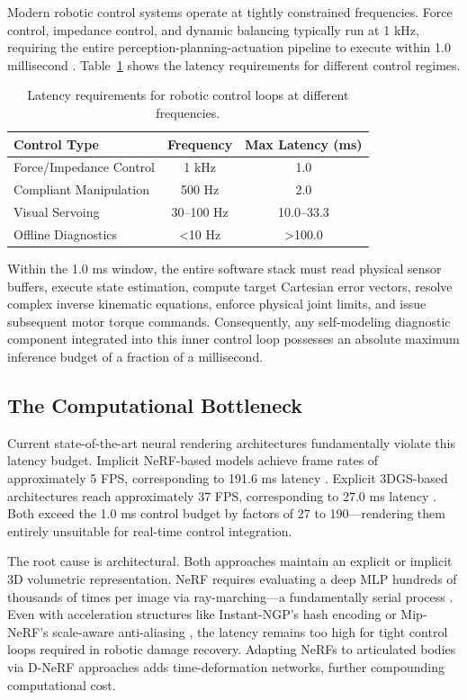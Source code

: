\documentclass[12pt,a4paper,oneside]{report}
\begin{document}
Modern robotic control systems operate at tightly constrained frequencies. Force control, impedance control, and dynamic balancing typically run at 1 kHz, requiring the entire perception-planning-actuation pipeline to execute within 1.0 millisecond \cite{siciliano2009robotics}. Table~\ref{tab:control_loop_latency} shows the latency requirements for different control regimes.

\begin{table}[H]
\centering
\caption{Latency requirements for robotic control loops at different frequencies.}
\label{tab:control_loop_latency}
\begin{tabular}{lcc}
\toprule
\textbf{Control Type} & \textbf{Frequency} & \textbf{Max Latency (ms)} \\
\midrule
Force/Impedance Control & 1 kHz & 1.0 \\
Compliant Manipulation & 500 Hz & 2.0 \\
Visual Servoing & 30–100 Hz & 10.0–33.3 \\
Offline Diagnostics & <10 Hz & >100.0 \\
\bottomrule
\end{tabular}
\end{table}

Within the 1.0 ms window, the entire software stack must read physical sensor buffers, execute state estimation, compute target Cartesian error vectors, resolve complex inverse kinematic equations, enforce physical joint limits, and issue subsequent motor torque commands. Consequently, any self-modeling diagnostic component integrated into this inner control loop possesses an absolute maximum inference budget of a fraction of a millisecond.

\subsection{The Computational Bottleneck}
\label{subsec:computational_bottleneck}

Current state-of-the-art neural rendering architectures fundamentally violate this latency budget. Implicit NeRF-based models achieve frame rates of approximately 5 FPS, corresponding to 191.6 ms latency \cite{hu2024teaching}. Explicit 3DGS-based architectures reach approximately 37 FPS, corresponding to 27.0 ms latency \cite{hu2025learning}. Both exceed the 1.0 ms control budget by factors of 27 to 190—rendering them entirely unsuitable for real-time control integration.

The root cause is architectural. Both approaches maintain an explicit or implicit 3D volumetric representation. NeRF requires evaluating a deep MLP hundreds of thousands of times per image via ray-marching—a fundamentally serial process \cite{mildenhall2020nerf}. Even with acceleration structures like Instant-NGP's hash encoding \cite{muller2022instant} or Mip-NeRF's scale-aware anti-aliasing \cite{barron2021mip}, the latency remains too high for tight control loops required in robotic damage recovery. Adapting NeRFs to articulated bodies via D-NeRF approaches \cite{pumarola2021d} adds time-deformation networks, further compounding computational cost.
\end{document}
